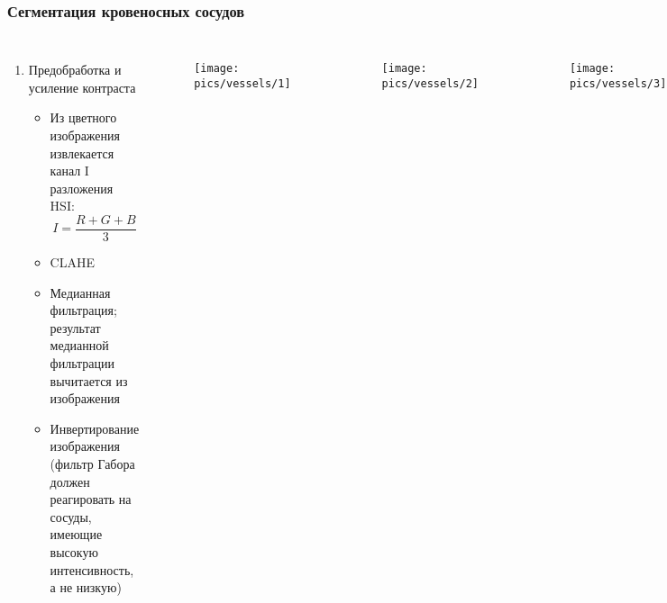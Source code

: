 \documentclass{beamer}
\begin{document}
\begin{frame}[fragile]
	\frametitle{Сегментация кровеносных сосудов}
	\vspace*{-0.3cm}
	\begin{columns}[c]
		\begin{enumerate}	
			\setcounter{enumi}{0}
			\item Предобработка и усиление контраста
			\begin{itemize}
				\item Из цветного изображения извлекается канал I разложения HSI:
				$$ I = \frac{R + G + B}{3} $$
				
				\item CLAHE
				\item Медианная фильтрация; результат медианной фильтрации вычитается из изображения
				\item Инвертирование изображения (фильтр Габора должен реагировать на сосуды, имеющие высокую интенсивность, а не низкую)
			\end{itemize}
		\end{enumerate}
			\begin{figure}
			\texttt{[image: pics/vessels/1]}
			\label{fig:1}
			\end{figure}
			\vspace*{-1.5cm}
			\begin{figure}
			\texttt{[image: pics/vessels/2]}
			\label{fig:2}
			\end{figure}
			\vspace*{-1.5cm}
			\begin{figure}
			\texttt{[image: pics/vessels/3]}
			\label{fig:3}
			\end{figure}
		
	\end{columns}
\end{frame}

\end{document}
